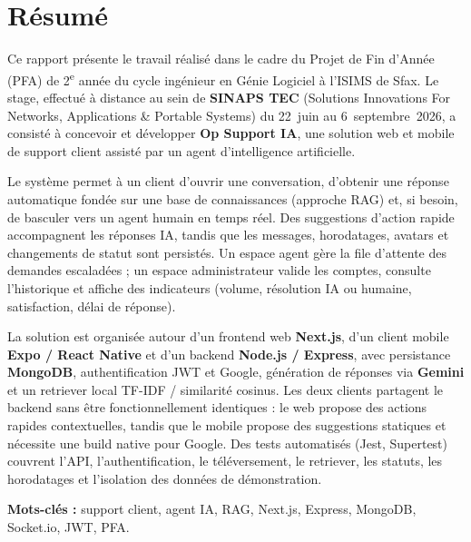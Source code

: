 \chapter*{Résumé}

Ce rapport présente le travail réalisé dans le cadre du Projet de Fin d'Année (PFA) de 2\textsuperscript{e} année du cycle ingénieur en Génie Logiciel à l'ISIMS de Sfax. Le stage, effectué à distance au sein de \textbf{SINAPS TEC} (Solutions Innovations For Networks, Applications \& Portable Systems) du 22~juin au 6~septembre~2026, a consisté à concevoir et développer \textbf{Op Support IA}, une solution web et mobile de support client assisté par un agent d'intelligence artificielle.

Le système permet à un client d'ouvrir une conversation, d'obtenir une réponse automatique fondée sur une base de connaissances (approche RAG) et, si besoin, de basculer vers un agent humain en temps réel. Des suggestions d'action rapide accompagnent les réponses IA, tandis que les messages, horodatages, avatars et changements de statut sont persistés. Un espace agent gère la file d'attente des demandes escaladées ; un espace administrateur valide les comptes, consulte l'historique et affiche des indicateurs (volume, résolution IA ou humaine, satisfaction, délai de réponse).

La solution est organisée autour d'un frontend web \textbf{Next.js}, d'un client mobile \textbf{Expo / React Native} et d'un backend \textbf{Node.js / Express}, avec persistance \textbf{MongoDB}, authentification JWT et Google, génération de réponses via \textbf{Gemini} et un retriever local TF-IDF / similarité cosinus. Les deux clients partagent le backend sans être fonctionnellement identiques : le web propose des actions rapides contextuelles, tandis que le mobile propose des suggestions statiques et nécessite une build native pour Google. Des tests automatisés (Jest, Supertest) couvrent l'API, l'authentification, le téléversement, le retriever, les statuts, les horodatages et l'isolation des données de démonstration.

\vspace{8pt}
\noindent\textbf{Mots-clés :} support client, agent IA, RAG, Next.js, Express, MongoDB, Socket.io, JWT, PFA.
